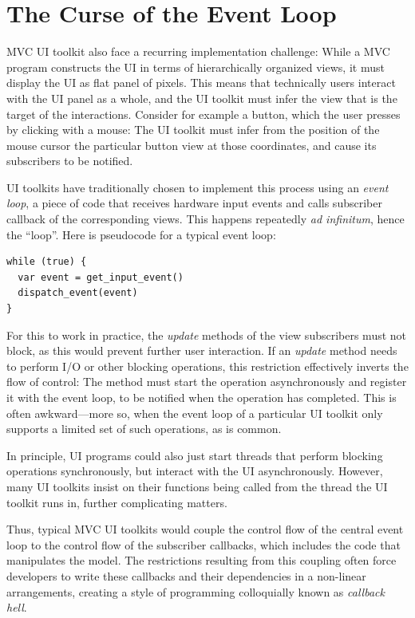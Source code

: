 \documentclass[sigplan,screen]{acmart}
\begin{document}
\section{The Curse of the Event Loop}
\label{sec:event-loop}

MVC UI toolkit also face a recurring implementation challenge: While a
MVC program constructs the UI in terms of hierarchically organized
views, it must display the UI as flat panel of pixels.  This means
that technically users interact with the UI panel as a whole, and the
UI toolkit must infer the view that is the target of the interactions.
Consider for example a button, which the user presses by clicking with
a mouse: The UI toolkit must infer from the position of the mouse
cursor the particular button view at those coordinates, and cause its
subscribers to be notified.

UI toolkits have traditionally chosen to implement this process using
an \textit{event loop}, a piece of code that receives hardware input
events and calls subscriber callback of the corresponding
views.  This happens repeatedly \textit{ad infinitum}, hence the
``loop''.  Here is pseudocode for a typical event loop:
%
\begin{verbatim}
while (true) {
  var event = get_input_event()
  dispatch_event(event)
}
\end{verbatim}
%
For this to work in practice, the \textit{update} methods of the view
subscribers must not block, as this would prevent further user
interaction.  If an \textit{update} method needs to perform I/O or
other blocking operations, this restriction effectively inverts the
flow of control: The method must start the operation asynchronously
and register it with the event loop, to be notified when the operation
has completed.  This is often awkward---more so, when the event loop
of a particular UI toolkit only supports a limited set of such
operations, as is common.

In principle, UI programs could also just start threads that perform
blocking operations synchronously, but interact with the UI
asynchronously.  However, many UI toolkits insist on their functions
being called from the thread the UI toolkit runs in, further
complicating matters.

Thus, typical MVC UI toolkits would couple the control flow of the
central event loop to the control flow of the subscriber callbacks,
which includes the code that manipulates the model.  The restrictions
resulting from this coupling often force developers to write these
callbacks and their dependencies in a non-linear arrangements,
creating a style of programming colloquially known as \textit{callback
  hell}.
\end{document}
